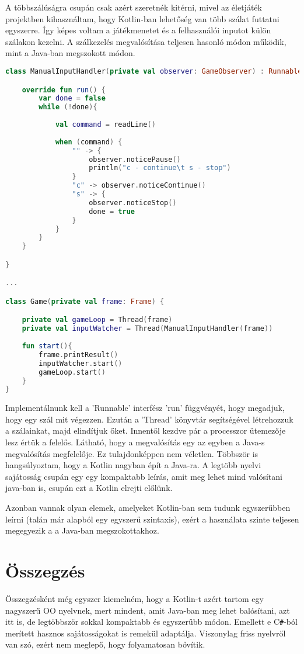 A többszálúságra csupán csak azért szeretnék kitérni, mivel az életjáték projektben kihasználtam, hogy Kotlin-ban lehetőség van több szálat futtatni egyszerre. Így képes voltam a játékmenetet és a felhasználói inputot külön szálakon kezelni. A szálkezelés megvalósítása teljesen hasonló módon működik, mint a Java-ban megszokott módon.
\scriptsize
\begin{lstlisting}[language = Kotlin]
class ManualInputHandler(private val observer: GameObserver) : Runnable {

	override fun run() {
		var done = false
		while (!done){
		
			val command = readLine()
			
			when (command) {
				"" -> {
					observer.noticePause()
					println("c - continue\t s - stop")
				}
				"c" -> observer.noticeContinue()
				"s" -> {
					observer.noticeStop()
					done = true
				}
			}
		}
	}

}

...

class Game(private val frame: Frame) {

	private val gameLoop = Thread(frame)
	private val inputWatcher = Thread(ManualInputHandler(frame))
	
	fun start(){
		frame.printResult()
		inputWatcher.start()
		gameLoop.start()
	}
}
\end{lstlisting}
\normalsize
Implementálnunk kell a 'Runnable' interfész 'run' függvényét, hogy megadjuk, hogy egy szál mit végezzen. Ezután a 'Thread' könyvtár segítségével létrehozzuk a szálainkat, majd elindítjuk őket. Innentől kezdve pár a processzor ütemezője lesz értük a felelős. Látható, hogy a megvalósítás egy az egyben a Java-s megvalósítás megfelelője. Ez tulajdonképpen nem véletlen. Többször is hangsúlyoztam, hogy a Kotlin nagyban épít a Java-ra. A legtöbb nyelvi sajátosság csupán egy egy kompaktabb leírás, amit meg lehet mind valósítani java-ban is, csupán ezt a Kotlin elrejti előlünk.

Azonban vannak olyan elemek, amelyeket Kotlin-ban sem tudunk egyszerűbben leírni (talán már alapból egy egyszerű szintaxis), ezért a használata szinte teljesen megegyezik a a Java-ban megszokottakhoz. 

\section{Összegzés}
\label{sec:k_summ}

Összegzésként még egyszer kiemelném, hogy a Kotlin-t azért tartom egy nagyszerű OO nyelvnek, mert mindent, amit Java-ban meg lehet balósítani, azt itt is, de legtöbbször sokkal kompaktabb és egyszerűbb módon. Emellett e C\verb|#|-ból merített hasznos sajátosságokat is remekül adaptálja. Viszonylag friss nyelvről van szó, ezért nem meglepő, hogy folyamatosan bővítik. 

